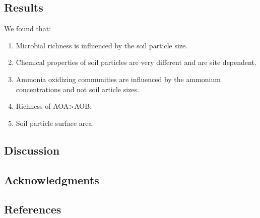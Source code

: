 \documentclass[
]{article}
\providecommand{\tightlist}{%
  \setlength{\itemsep}{0pt}\setlength{\parskip}{0pt}}
\begin{document}
\hypertarget{results}{%
\subsection{Results}\label{results}}

We found that:

\begin{enumerate}
\def\labelenumi{\arabic{enumi}.}
\tightlist
\item
  Microbial richness is influenced by the soil particle size.\\
\item
  Chemical properties of soil particles are very different and are site
  dependent.
\item
  Ammonia oxidizing communities are influenced by the ammonium
  concentrations and not soil article sizes.
\item
  Richness of AOA\textgreater AOB.
\item
  Soil particle surface area.
\end{enumerate}

\newpage

\hypertarget{discussion}{%
\subsection{Discussion}\label{discussion}}

\newpage

\hypertarget{acknowledgments}{%
\subsection{Acknowledgments}\label{acknowledgments}}

\hypertarget{references}{%
\subsection{References}\label{references}}

\newpage
\end{document}
